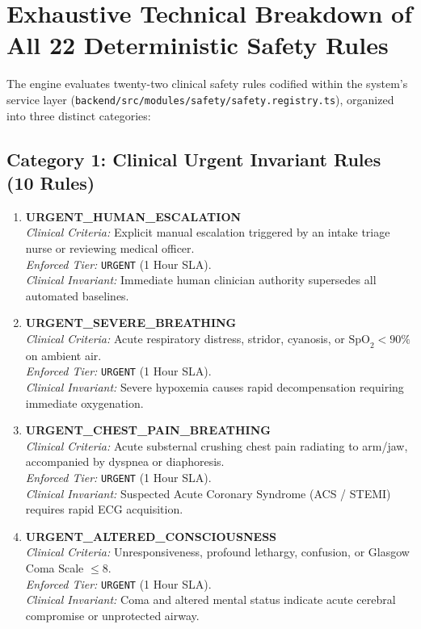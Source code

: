 \documentclass[11pt,a4paper,oneside]{report}
\begin{document}
\section{Exhaustive Technical Breakdown of All 22 Deterministic Safety Rules}
The engine evaluates twenty-two clinical safety rules codified within the system's service layer (\texttt{backend/src/modules/safety/safety.registry.ts}), organized into three distinct categories:

\subsection{Category 1: Clinical Urgent Invariant Rules (10 Rules)}

\begin{enumerate}[leftmargin=20pt]
  \item \textbf{URGENT\_HUMAN\_ESCALATION}\\
  \textit{Clinical Criteria:} Explicit manual escalation triggered by an intake triage nurse or reviewing medical officer.\\
  \textit{Enforced Tier:} \texttt{URGENT} (1 Hour SLA).\\
  \textit{Clinical Invariant:} Immediate human clinician authority supersedes all automated baselines.

  \item \textbf{URGENT\_SEVERE\_BREATHING}\\
  \textit{Clinical Criteria:} Acute respiratory distress, stridor, cyanosis, or $\text{SpO}_2 < 90\%$ on ambient air.\\
  \textit{Enforced Tier:} \texttt{URGENT} (1 Hour SLA).\\
  \textit{Clinical Invariant:} Severe hypoxemia causes rapid decompensation requiring immediate oxygenation.

  \item \textbf{URGENT\_CHEST\_PAIN\_BREATHING}\\
  \textit{Clinical Criteria:} Acute substernal crushing chest pain radiating to arm/jaw, accompanied by dyspnea or diaphoresis.\\
  \textit{Enforced Tier:} \texttt{URGENT} (1 Hour SLA).\\
  \textit{Clinical Invariant:} Suspected Acute Coronary Syndrome (ACS / STEMI) requires rapid ECG acquisition.

  \item \textbf{URGENT\_ALTERED\_CONSCIOUSNESS}\\
  \textit{Clinical Criteria:} Unresponsiveness, profound lethargy, confusion, or Glasgow Coma Scale $\le 8$.\\
  \textit{Enforced Tier:} \texttt{URGENT} (1 Hour SLA).\\
  \textit{Clinical Invariant:} Coma and altered mental status indicate acute cerebral compromise or unprotected airway.


\end{enumerate}
\end{document}
